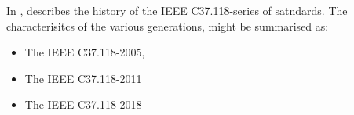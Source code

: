 In \cite{martin2013synchrophasor}, \citeauthor{martin2013synchrophasor}describes the history of the 
IEEE C37.118-series of satndards. The characterisitcs of the various generations, might be summarised as:
\begin{itemize}
    \item The IEEE C37.118-2005,
    \item The IEEE C37.118-2011
    \item The IEEE C37.118-2018
\end{itemize}

















 



